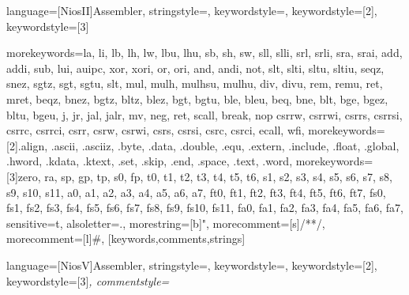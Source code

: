  {
  language=[NiosII]{Assembler},
  stringstyle=\color{niosStringColour},
  keywordstyle=\color{niosInstructionColour},
  keywordstyle=[2]\color{niosDirectiveColour},
  keywordstyle=[3]\itshape\color{niosSpecialRegColour}
}

 {
 	morekeywords={la, li, lb, lh, lw, lbu, lhu, sb, sh, sw, sll, slli, srl, srli, sra, srai,
    add, addi, sub, lui, auipc, xor, xori, or, ori, and, andi, not, slt, slti, sltu, sltiu,
    seqz, snez, sgtz, sgt, sgtu, slt, mul, mulh, mulhsu, mulhu, div, divu, rem, remu,
    ret, mret, beqz, bnez, bgtz, bltz, blez, bgt, bgtu, ble, bleu,
    beq, bne, blt, bge, bgez, bltu, bgeu, j, jr, jal, jalr, mv, neg, ret, scall, break, nop
    csrrw, csrrwi, csrrs, csrrsi, csrrc, csrrci, csrr, csrw, csrwi, csrs, csrsi, csrc,
    csrci, ecall, wfi},%
 	morekeywords=[2]{.align, .ascii, .asciiz, .byte, .data, .double, .equ, .extern, .include,
    .float, .global, .hword, .kdata, .ktext, .set, .skip, .end, .space, .text, .word},%
 	morekeywords=[3]{zero, ra, sp, gp, tp, s0, fp, t0, t1, t2, t3, t4, t5, t6,
    s1, s2, s3, s4, s5, s6, s7, s8, s9, s10, s11, a0, a1, a2, a3, a4, a5, a6, a7,
    ft0, ft1, ft2, ft3, ft4, ft5, ft6, ft7, fs0, fs1, fs2, fs3, fs4, fs5, fs6, fs7, 
    fs8, fs9, fs10, fs11, fa0, fa1, fa2, fa3, fa4, fa5, fa6, fa7},%
 	sensitive=t,%
 	alsoletter=.,%
	morestring=[b]",%
 	morecomment=[s]{/*}{*/},%
 	morecomment=[l]\#,%
   }[keywords,comments,strings]
   
   
   
    {
   language=[NiosV]{Assembler},
   stringstyle=\color{niosVStringColour},
   keywordstyle=\color{niosVInstructionColour},
   keywordstyle=[2]\color{niosVDirectiveColour},
   keywordstyle=[3]\itshape\color{niosVSpecialRegColour},
   commentstyle=\small\color{brown}\ttfamily
   }

